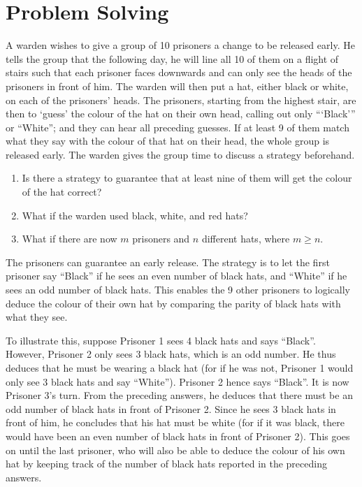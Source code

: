 \section{Problem Solving}

\begin{problem}
    A warden wishes to give a group of 10 prisoners a change to be released early. He tells the group that the following day, he will line all 10 of them on a flight of stairs such that each prisoner faces downwards and can only see the heads of the prisoners in front of him. The warden will then put a hat, either black or white, on each of the prisoners' heads. The prisoners, starting from the highest stair, are then to `guess' the colour of the hat on their own head, calling out only ```Black''' or ``White''; and they can hear all preceding guesses. If at least 9 of them match what they say with the colour of that hat on their head, the whole group is released early. The warden gives the group time to discuss a strategy beforehand.

    \begin{enumerate}
        \item Is there a strategy to guarantee that at least nine of them will get the colour of the hat correct?
        \item What if the warden used black, white, and red hats?
        \item What if there are now $m$ prisoners and $n$ different hats, where $m \geq n$.
    \end{enumerate}
\end{problem}
\begin{solution}
    \begin{ppart}
        The prisoners can guarantee an early release. The strategy is to let the first prisoner say ``Black'' if he sees an even number of black hats, and ``White'' if he sees an odd number of black hats. This enables the 9 other prisoners to logically deduce the colour of their own hat by comparing the parity of black hats with what they see.

        To illustrate this, suppose Prisoner 1 sees 4 black hats and says ``Black''. However, Prisoner 2 only sees 3 black hats, which is an odd number. He thus deduces that he must be wearing a black hat (for if he was not, Prisoner 1 would only see 3 black hats and say ``White''). Prisoner 2 hence says ``Black''. It is now Prisoner 3's turn. From the preceding answers, he deduces that there must be an odd number of black hats in front of Prisoner 2. Since he sees 3 black hats in front of him, he concludes that his hat must be white (for if it was black, there would have been an even number of black hats in front of Prisoner 2). This goes on until the last prisoner, who will also be able to deduce the colour of his own hat by keeping track of the number of black hats reported in the preceding answers.
    \end{ppart}
\end{solution}

